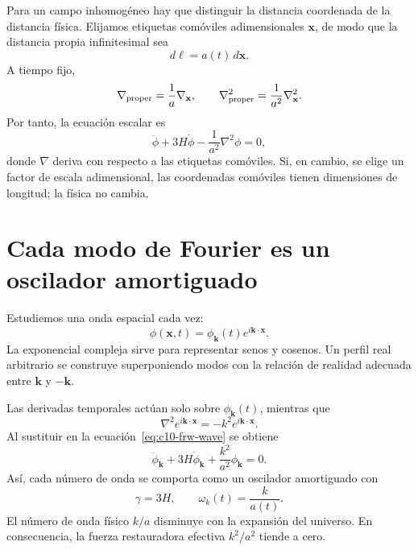 Para un campo inhomogéneo hay que distinguir la distancia coordenada de la distancia física. Elijamos etiquetas comóviles adimensionales \(\mathbf x\), de modo que la distancia propia infinitesimal sea
\[
d\boldsymbol\ell=a(t)\,d\mathbf x.
\]
A tiempo fijo,
\[
\nabla_{\rm proper}=\frac{1}{a}\nabla_{\mathbf x},
\qquad
\nabla_{\rm proper}^2=\frac{1}{a^2}\nabla_{\mathbf x}^2.
\]
Por tanto, la ecuación escalar es
\begin{equation}
\ddot\phi+3H\dot\phi-\frac{1}{a^2}\nabla^2\phi=0,
\label{eq:c10-frw-wave}
\end{equation}
donde \(\nabla\) deriva con respecto a las etiquetas comóviles. Si, en cambio, se elige un factor de escala adimensional, las coordenadas comóviles tienen dimensiones de longitud; la física no cambia.

\begin{classroomqa}
\end{classroomqa}

\section{Cada modo de Fourier es un oscilador amortiguado}

Estudiemos una onda espacial cada vez:
\begin{equation}
\phi(\mathbf x,t)
=\phi_{\mathbf k}(t)e^{i\mathbf k\cdot\mathbf x}.
\label{eq:c10-mode-ansatz}
\end{equation}
La exponencial compleja sirve para representar senos y cosenos. Un perfil real arbitrario se construye superponiendo modos con la relación de realidad adecuada entre \(\mathbf k\) y \(-\mathbf k\).

Las derivadas temporales actúan solo sobre \(\phi_{\mathbf k}(t)\), mientras que
\[
\nabla^2e^{i\mathbf k\cdot\mathbf x}
=-k^2e^{i\mathbf k\cdot\mathbf x}.
\]
Al sustituir en la ecuación~\eqref{eq:c10-frw-wave} se obtiene
\begin{equation}
\ddot\phi_{\mathbf k}
+3H\dot\phi_{\mathbf k}
+\frac{k^2}{a^2}\phi_{\mathbf k}=0.
\label{eq:c10-mode-equation}
\end{equation}
Así, cada número de onda se comporta como un oscilador amortiguado con
\begin{equation}
\gamma=3H,
\qquad
\omega_k(t)=\frac{k}{a(t)}.
\label{eq:c10-mode-identification}
\end{equation}
El número de onda físico \(k/a\) disminuye con la expansión del universo. En consecuencia, la fuerza restauradora efectiva \(k^2/a^2\) tiende a cero.

